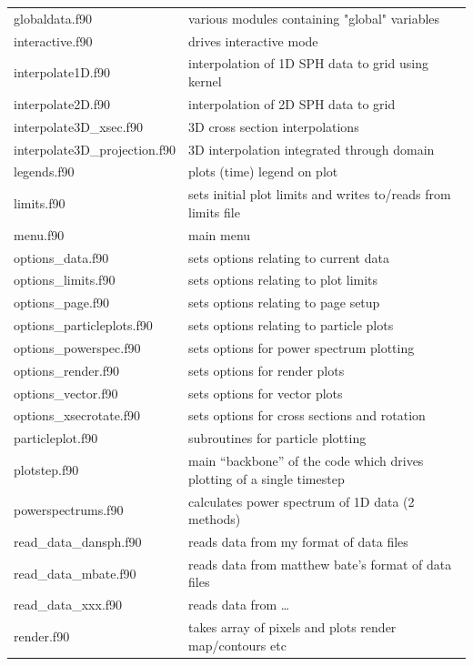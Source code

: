 \documentclass[a4paper,11pt]{article}
\begin{document}
\begin{longtable}{|lp{}|}
     globaldata.f90         & various modules containing "global" variables\\
     interactive.f90        & drives interactive mode\\
     interpolate1D.f90	 & interpolation of 1D SPH data to grid using kernel\\
     interpolate2D.f90	 & interpolation of 2D SPH data to grid     \\
     interpolate3D\_xsec.f90 & 3D cross section interpolations\\
     interpolate3D\_projection.f90	 & 3D interpolation integrated through domain\\
     legends.f90		       & plots (time) legend on plot\\
     limits.f90                   & sets initial plot limits and writes to/reads from limits file\\
     menu.f90               & main menu\\
     options\_data.f90       & sets options relating to current data\\
     options\_limits.f90     & sets options relating to plot limits\\
     options\_page.f90       & sets options relating to page setup\\
     options\_particleplots.f90 & sets options relating to particle plots\\
     options\_powerspec.f90  & sets options for power spectrum plotting\\
     options\_render.f90	 & sets options for render plots\\
     options\_vector.f90	 & sets options for vector plots\\
     options\_xsecrotate.f90 & sets options for cross sections and rotation\\
     particleplot.f90       & subroutines for particle plotting\\
     plotstep.f90           & main ``backbone'' of the code which drives plotting of a single timestep\\
     powerspectrums.f90     & calculates power spectrum of 1D data (2 methods)\\
     read\_data\_dansph.f90   & reads data from my format of data files\\
     read\_data\_mbate.f90    & reads data from matthew bate's format of data files\\
     read\_data\_xxx.f90 & reads data from \ldots \\ 
     render.f90	 	 & takes array of pixels and plots render map/contours etc\\

\end{longtable}
\end{document}
